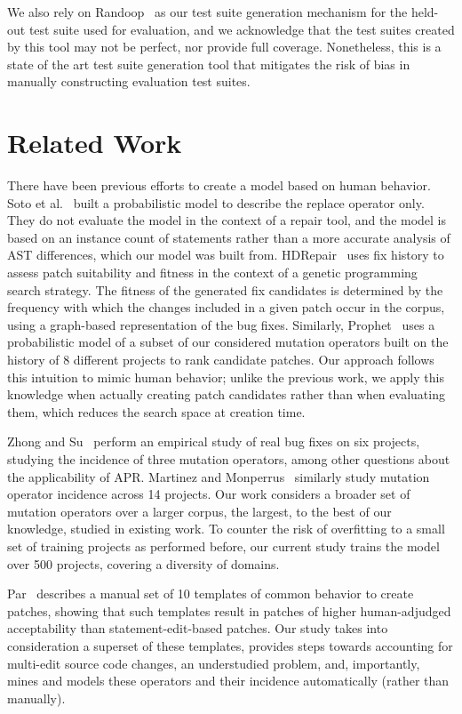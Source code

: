 \documentclass[conference]{IEEEtran}
\begin{document}
We also rely on Randoop~\cite{pacheco07} as our test suite generation mechanism 
for the held-out test suite used for evaluation, and we acknowledge that the 
test suites created by this tool may not be perfect, nor provide full coverage. 
Nonetheless, this is a state of the art test suite generation tool that mitigates the risk of bias in manually constructing evaluation test suites.

\section{Related Work} \label{relatedWork}

There have been previous efforts to create a model based on human behavior.  
Soto et al.~\cite{Soto16} 
built a probabilistic model to describe the replace 
operator only. They do not evaluate the model in the context of a repair
tool, and the model is based on an instance count of statements rather than a more 
accurate analysis of AST differences, which our model was built from.  
HDRepair~\cite{xuan16} 
uses fix history
to assess patch suitability and fitness in the context of a genetic
programming search strategy. The fitness of the generated
fix candidates is determined by the frequency with which the changes included in
a given patch occur in the corpus, using a graph-based representation of the bug
fixes.  Similarly, Prophet~\cite{long16proph} uses a
probabilistic model of a subset of our considered mutation operators built on 
the history of 8 different projects to rank candidate
patches.  Our approach follows this intuition to mimic human
behavior; unlike the previous work, we apply this knowledge when actually
creating patch candidates rather than when evaluating them, which reduces the 
search space at creation time.  

Zhong and Su~\cite{zhong15} perform an empirical study of
real bug fixes on six projects, studying the incidence of three mutation
operators, among other questions about the applicability of APR.  Martinez and
Monperrus~\cite{martinez15} similarly study mutation operator incidence across 
14 
projects. Our work considers a broader set of
mutation operators over a larger corpus, the largest, to the best of our
knowledge, studied in existing work. To counter the 
risk of overfitting to a small set of training projects as performed before, our 
current study trains the model over 500 projects, covering a diversity 
of domains.

Par~\cite{kim2013} describes a manual set of 10 templates of common behavior to
create patches, showing that such templates result in patches of higher
human-adjudged acceptability than statement-edit-based patches.  Our study takes 
into consideration a superset
of these templates, provides steps towards
accounting for multi-edit source code changes, an understudied problem, and,
importantly, mines and models these operators and their incidence automatically
(rather than manually).
\end{document}
